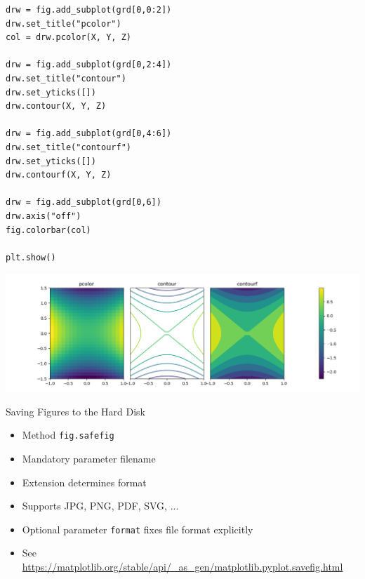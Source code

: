 
\begin{frame}[fragile]
%
\begin{codebox}[... continued]
\begin{verbatim}
drw = fig.add_subplot(grd[0,0:2])
drw.set_title("pcolor")
col = drw.pcolor(X, Y, Z)

drw = fig.add_subplot(grd[0,2:4])
drw.set_title("contour")
drw.set_yticks([])
drw.contour(X, Y, Z)

drw = fig.add_subplot(grd[0,4:6])
drw.set_title("contourf")
drw.set_yticks([])
drw.contourf(X, Y, Z)

drw = fig.add_subplot(grd[0,6])
drw.axis("off")
fig.colorbar(col)

plt.show()
\end{verbatim}
\end{codebox}
%
\end{frame}


\begin{frame}
%
\begin{tcolorbox}[title=Output: Heightmaps]
	\includegraphics[width=\linewidth]{./gfx/plt-falseColour}
\end{tcolorbox}
%
\end{frame}


\begin{frame}{Saving Figures to the Hard Disk}
%
\begin{itemize}
\item Method \texttt{fig.safefig}
\item Mandatory parameter filename
\item Extension determines format
\item Supports JPG, PNG, PDF, SVG, ...
\item Optional parameter \texttt{format} fixes file format explicitly
\item See \url{https://matplotlib.org/stable/api/_as_gen/matplotlib.pyplot.savefig.html}
\end{itemize}
%
\end{frame}